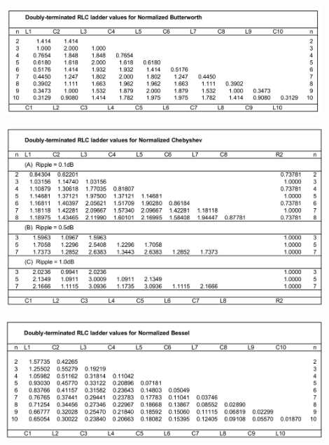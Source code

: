 \centering
\includegraphics[width=0.9\textwidth]{ldb.png}\\
\raggedright


\centering
\includegraphics[width=0.9\textwidth]{ldc.png}\\
\raggedright

\centering
\includegraphics[width=0.9\textwidth]{ldb1.png}\\
\raggedright

